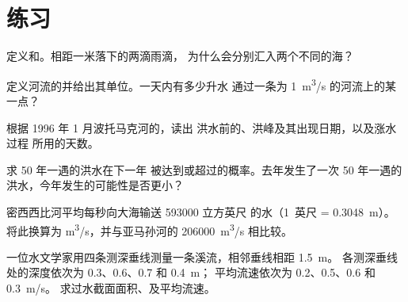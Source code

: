 \section{练习}

\begin{exercise}[$\star$]\label{exo:g10:drainage-basins:1}
定义和。相距一米落下的两滴雨滴，
为什么会分别汇入两个不同的海？
\end{exercise}

\begin{exercise}[$\star$]\label{exo:g10:drainage-basins:2}
定义河流的并给出其单位。一天内有多少升水
通过一条为 \qty{1}{m^3/s} 的河流上的某一点？
\end{exercise}

\begin{exercise}[$\star$]\label{exo:g10:drainage-basins:3}
根据 1996 年 1 月波托马克河的，读出
洪水前的、洪峰及其出现日期，以及涨水过程
所用的天数。
\end{exercise}

\begin{exercise}[$\star$]\label{exo:g10:drainage-basins:4}
求 \num{50} 年一遇的洪水在下一年
被达到或超过的概率。去年发生了一次
\num{50} 年一遇的洪水，今年发生的可能性是否更小？
\end{exercise}

\begin{exercise}[$\star$]\label{exo:g10:drainage-basins:5}
密西西比河平均每秒向大海输送 \num{593000} 立方英尺
的水（\num{1}~英尺 = \qty{0.3048}{m}）。将此换算为
\unit{m^3/s}，并与亚马孙河的
\qty{206000}{m^3/s} 相比较。
\end{exercise}

\begin{exercise}[$\star\star$]\label{exo:g10:drainage-basins:6}
一位水文学家用四条测深垂线测量一条溪流，相邻垂线相距 \qty{1.5}{m}。
各测深垂线处的深度依次为 \num{0.3}、\num{0.6}、\num{0.7} 和 \qty{0.4}{m}；
平均流速依次为 \num{0.2}、\num{0.5}、\num{0.6} 和 \qty{0.3}{m/s}。
求过水截面面积、及平均流速。
\end{exercise}

